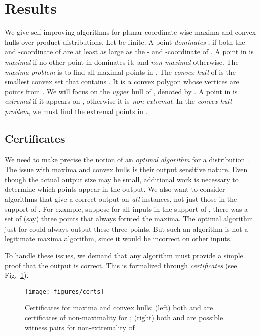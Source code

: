 \documentclass[letterpaper,11pt]{article}
\begin{document}
\section{Results} 
\label{sec:results}

We give self-improving algorithms 
for planar coordinate-wise maxima
and convex hulls over product 
distributions. 
Let  be finite.
A point 
\emph{dominates} ,
if both the - and -coordinate
of  are at least as large as
the - and -coordinate of .
A point in  is \emph{maximal}
if no other point in  dominates
it, and \emph{non-maximal} otherwise.
The \emph{maxima problem} is
to find all maximal points in .
The \emph{convex hull} of  is the
smallest convex set that contains .
It is a convex polygon whose vertices
are points from . 
We will focus on the \emph{upper} hull of ,
denoted by .  A point in 
is \emph{extremal} if it appears on 
, otherwise it is 
\emph{non-extremal}. In the \emph{convex
hull problem}, we must find the extremal
points in .

\subsection{Certificates}

We need to make precise the notion of an \emph{optimal algorithm}
for a distribution . The 
issue with maxima and convex hulls
is their output sensitive nature.
Even though the actual output size
may be small, additional work 
is necessary to determine which
points appear in the output. We also want to consider algorithms
that give a correct output on \emph{all} instances, not just those
in the support of . For example, suppose for all inputs in the support of ,
there was a set of (say) three points that always formed the maxima. The optimal
algorithm just for  could always output these three points. But such an algorithm
is not a legitimate maxima algorithm, since it would be incorrect on other inputs.

To handle these issues, we demand that any algorithm must provide a simple proof
that the output is correct.
This is formalized through \emph{certificates} (see Fig.~\ref{fig:certs}).


\begin{figure}
  \centering
  \texttt{[image: figures/certs]}

   \caption{Certificates for maxima 
     and convex hulls: (left) both 
      and  are certificates of 
     non-maximality for ; (right) 
     both  and  
     are possible witness pairs 
     for non-extremality of .
   }
  \label{fig:certs}
\end{figure}
\end{document}
